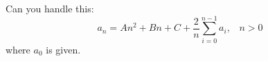   Can you handle this:
  \[
  a_n = An^2 + Bn + C + \frac{2}{n} \sum_{i=0}^{n-1} a_i, \,\,\,\,\, n > 0
  \]
  where $a_0$ is given.
